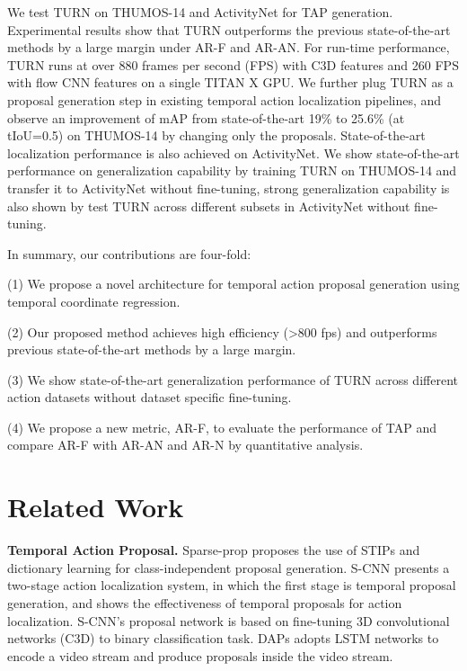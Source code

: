 \documentclass[10pt,twocolumn,letterpaper]{article}
\begin{document}
We test TURN on THUMOS-14 and ActivityNet for TAP generation. Experimental results show that TURN outperforms the previous state-of-the-art methods \cite{escorcia2016daps, Shou_2016_CVPR} by a large margin under AR-F and AR-AN. For run-time performance, TURN runs at over 880 frames per second (FPS) with C3D features and 260 FPS with flow CNN features on a single TITAN X GPU. We further plug TURN as a proposal generation step in existing temporal action localization pipelines, and observe an improvement of mAP from state-of-the-art 19\% to 25.6\% (at tIoU=0.5) on THUMOS-14 by changing only the proposals. State-of-the-art localization performance is also achieved on ActivityNet. We show state-of-the-art performance on generalization capability by training TURN on THUMOS-14 and transfer it to ActivityNet without fine-tuning, strong generalization capability is also shown by test TURN across different subsets in ActivityNet without fine-tuning. 

In summary, our contributions are four-fold:

(1) We propose a novel architecture for temporal action proposal generation using temporal coordinate regression.


(2) Our proposed method achieves high efficiency (\textgreater800 fps) and outperforms previous state-of-the-art methods by a large margin.


(3) We show state-of-the-art generalization performance of TURN across different action datasets without dataset specific fine-tuning.

(4) We propose a new metric, AR-F, to evaluate the performance of TAP and compare AR-F with AR-AN and AR-N by quantitative analysis.




\section{Related Work}

\textbf{Temporal Action Proposal.} Sparse-prop \cite{Heilbron_2016_CVPR} proposes the use of STIPs \cite{laptev2005space} and dictionary learning for class-independent proposal generation. S-CNN \cite{Shou_2016_CVPR} presents a two-stage action localization system, in which the first stage is temporal proposal generation, and shows the effectiveness of temporal proposals for action localization. S-CNN's proposal network is based on fine-tuning 3D convolutional networks (C3D) \cite{tran2015learning} to binary classification task. DAPs \cite{escorcia2016daps} adopts LSTM networks to encode a video stream and produce proposals inside the video stream. 
\end{document}
